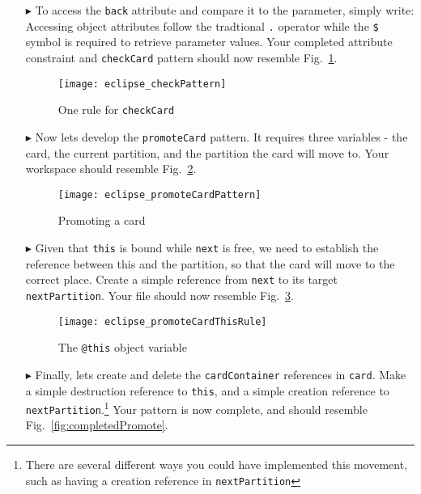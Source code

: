 \begin{itemize}
\item[$\blacktriangleright$] To access the \texttt{back} attribute and compare it to the parameter, simply write: 
Accessing object attributes follow the tradtional \texttt{.} operator while the \texttt{\$} symbol is required to retrieve parameter values. Your completed
attribute constraint and \texttt{checkCard} pattern should now resemble Fig.~\ref{fig:checkPattern}.

\begin{figure}[htbp]
\begin{center}
  \texttt{[image: eclipse\_checkPattern]}
  \caption{One rule for \texttt{checkCard}}
  \label{fig:checkPattern}
\end{center}
\end{figure} 

\clearpage

\item[$\blacktriangleright$] Now lets develop the \texttt{promoteCard} pattern. It requires three variables - the card, the current partition, and the partition
the card will move to. Your workspace should resemble Fig.~\ref{fig:promoteCardPattern}.

\begin{figure}[htbp]
\begin{center}
  \texttt{[image: eclipse\_promoteCardPattern]}
  \caption{Promoting a card}
  \label{fig:promoteCardPattern}
\end{center}
\end{figure} 

\item[$\blacktriangleright$] Given that \texttt{this} is bound while \texttt{next} is free, we need to establish the reference between this and the
partition, so that the card will move to the correct place. Create a simple reference from \texttt{next} to its target \texttt{nextPartition}. Your file should
now resemble Fig.~\ref{fig:promoteThisRule}.

\vspace{0.5cm}

\begin{figure}[htbp]
\begin{center}
  \texttt{[image: eclipse\_promoteCardThisRule]}
  \caption{The \texttt{@this} object variable}
  \label{fig:promoteThisRule}
\end{center}
\end{figure} 

\item[$\blacktriangleright$] Finally, lets create and delete the \texttt{cardContainer} references in \texttt{card}. Make a simple destruction reference to
\texttt{this}, and a simple creation reference to \texttt{nextPartition}.\footnote{There are several different ways you could have implemented this movement, such as having a
creation reference in \texttt{nextPartition}} Your pattern is now complete, and should resemble Fig.~\ref{fig:completedPromote}.


\end{itemize}
